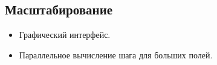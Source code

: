 \subsection*{Масштабирование}

\begin{itemize}
	\item Графический интерфейс.
	\item Параллельное вычисление шага для больших полей.
\end{itemize}

